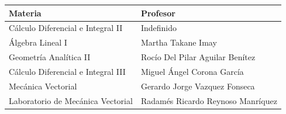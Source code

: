\documentclass{article}
\begin{document}
\begin{landscape}
\begin{center}
\begin{tabular}{|m{6cm}|m{6cm}|}
\textbf{Materia} & \textbf{Profesor} \\
\hline
Cálculo Diferencial e Integral II & Indefinido \\
Álgebra Lineal I & Martha Takane Imay \\
Geometría Analítica II & Rocío Del Pilar Aguilar Benítez \\
Cálculo Diferencial e Integral III & Miguel Ángel Corona García \\
Mecánica Vectorial & Gerardo Jorge Vazquez Fonseca \\
Laboratorio de Mecánica Vectorial & Radamés Ricardo Reynoso Manríquez \\
\hline
\end{tabular}
\end{center}
\end{landscape}
\end{document}
